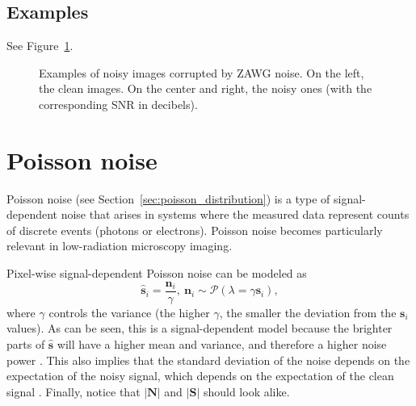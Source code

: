 \subsection*{Examples}

See Figure~\ref{fig:ZAWG_examples}.

\begin{figure}
  \centering
  \caption{Examples of noisy images corrupted by \gls{ZAWG} noise. On
    the left, the clean images. On the center and right, the noisy
    ones (with the corresponding \gls{SNR} in
    decibels). \label{fig:ZAWG_examples}}
\end{figure}



\section{Poisson noise}

Poisson noise (see Section~\ref{sec:poisson_distribution}) is a type
of signal-dependent noise that arises in systems where the measured
data represent counts of discrete events (photons or
electrons). Poisson noise becomes particularly relevant in
low-radiation microscopy imaging.

Pixel-wise signal-dependent Poisson noise can be modeled as
\begin{equation}
  \hat{\mathbf{s}}_i = \frac{\mathbf{n}_i}{\gamma},~\mathbf{n}_i\sim\mathcal{P}(\lambda=\gamma\mathbf{s}_i),
  \label{eq:PN_i}
\end{equation}
where $\gamma$ controls the variance (the higher $\gamma$, the smaller
the deviation from the $\mathbf{s}_i$ values). As can be seen, this is
a signal-dependent model because the brighter parts of
$\hat{\mathbf s}$ will have a higher mean and variance, and therefore
a higher noise power \cite{meiniel2018denoising}. This also implies
that the standard deviation of the noise depends on the expectation of
the noisy signal, which depends on the expectation of the clean signal
\cite{foi2008practical}. Finally, notice that $|\mathbf{N}|$ and
$|\mathbf{S}|$ should look alike.

